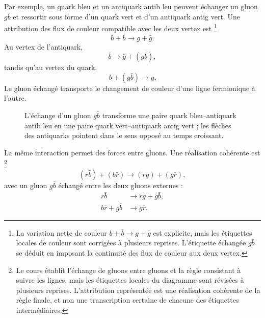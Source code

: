 Par exemple, un quark bleu et un antiquark antib leu peuvent échanger un gluon \(g\bar b\) et ressortir sous forme d’un quark vert et d’un antiquark antig vert. Une attribution des flux de couleur compatible avec les deux vertex est \footnote{La variation nette de couleur \(b+\bar b\longrightarrow g+\bar g\) est explicite, mais les étiquettes locales de couleur sont corrigées à plusieurs reprises. L’étiquette échangée \(g\bar b\) se déduit en imposant la continuité des flux de couleur aux deux vertex.}
\begin{equation}
b+\bar b
\longrightarrow
g+\bar g.
\end{equation}
Au vertex de l’antiquark,
\begin{equation}
\bar b\longrightarrow\bar g+(g\bar b),
\end{equation}
tandis qu’au vertex du quark,
\begin{equation}
b+(g\bar b)\longrightarrow g.
\end{equation}
Le gluon échangé transporte le changement de couleur d’une ligne fermionique à l’autre.

\begin{figure}[h]
\centering
{}
\caption{L’échange d’un gluon \(g\bar b\) transforme une paire quark bleu--antiquark antib leu en une paire quark vert--antiquark antig vert ; les flèches des antiquarks pointent dans le sens opposé au temps croissant.}
\end{figure}

La même interaction permet des forces entre gluons. Une réalisation cohérente est \footnote{Le cours établit l’échange de gluons entre gluons et la règle consistant à suivre les lignes, mais les étiquettes locales du diagramme sont révisées à plusieurs reprises. L’attribution représentée est une réalisation cohérente de la règle finale, et non une transcription certaine de chacune des étiquettes intermédiaires.}
\begin{equation}
(r\bar b)+(b\bar r)
\longrightarrow
(r\bar g)+(g\bar r),
\end{equation}
avec un gluon \(g\bar b\) échangé entre les deux gluons externes :
\begin{align}
r\bar b&\longrightarrow r\bar g+g\bar b,\\
b\bar r+g\bar b&\longrightarrow g\bar r.
\end{align}


